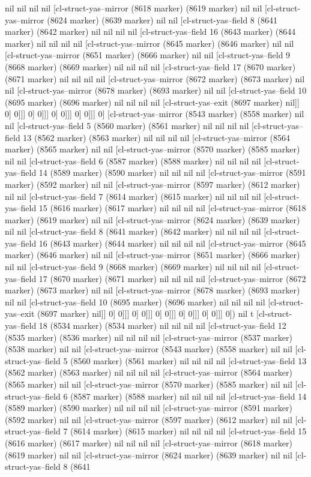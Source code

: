 {{nil nil nil nil [cl-struct-yas--mirror (8618 marker) (8619 marker) nil nil [cl-struct-yas--mirror (8624 marker) (8639 marker) nil nil [cl-struct-yas--field 8 (8641 marker) (8642 marker) nil nil nil nil [cl-struct-yas--field 16 (8643 marker) (8644 marker) nil nil nil nil [cl-struct-yas--mirror (8645 marker) (8646 marker) nil nil [cl-struct-yas--mirror (8651 marker) (8666 marker) nil nil [cl-struct-yas--field 9 (8668 marker) (8669 marker) nil nil nil nil [cl-struct-yas--field 17 (8670 marker) (8671 marker) nil nil nil nil [cl-struct-yas--mirror (8672 marker) (8673 marker) nil nil [cl-struct-yas--mirror (8678 marker) (8693 marker) nil nil [cl-struct-yas--field 10 (8695 marker) (8696 marker) nil nil nil nil [cl-struct-yas--exit (8697 marker) nil]] 0] 0]]] 0] 0]]] 0] 0]]] 0] 0]]] 0] [cl-struct-yas--mirror (8543 marker) (8558 marker) nil nil [cl-struct-yas--field 5 (8560 marker) (8561 marker) nil nil nil nil [cl-struct-yas--field 13 (8562 marker) (8563 marker) nil nil nil nil [cl-struct-yas--mirror (8564 marker) (8565 marker) nil nil [cl-struct-yas--mirror (8570 marker) (8585 marker) nil nil [cl-struct-yas--field 6 (8587 marker) (8588 marker) nil nil nil nil [cl-struct-yas--field 14 (8589 marker) (8590 marker) nil nil nil nil [cl-struct-yas--mirror (8591 marker) (8592 marker) nil nil [cl-struct-yas--mirror (8597 marker) (8612 marker) nil nil [cl-struct-yas--field 7 (8614 marker) (8615 marker) nil nil nil nil [cl-struct-yas--field 15 (8616 marker) (8617 marker) nil nil nil nil [cl-struct-yas--mirror (8618 marker) (8619 marker) nil nil [cl-struct-yas--mirror (8624 marker) (8639 marker) nil nil [cl-struct-yas--field 8 (8641 marker) (8642 marker) nil nil nil nil [cl-struct-yas--field 16 (8643 marker) (8644 marker) nil nil nil nil [cl-struct-yas--mirror (8645 marker) (8646 marker) nil nil [cl-struct-yas--mirror (8651 marker) (8666 marker) nil nil [cl-struct-yas--field 9 (8668 marker) (8669 marker) nil nil nil nil [cl-struct-yas--field 17 (8670 marker) (8671 marker) nil nil nil nil [cl-struct-yas--mirror (8672 marker) (8673 marker) nil nil [cl-struct-yas--mirror (8678 marker) (8693 marker) nil nil [cl-struct-yas--field 10 (8695 marker) (8696 marker) nil nil nil nil [cl-struct-yas--exit (8697 marker) nil]] 0] 0]]] 0] 0]]] 0] 0]]] 0] 0]]] 0] 0]]] 0]) nil t [cl-struct-yas--field 18 (8534 marker) (8534 marker) nil nil nil nil [cl-struct-yas--field 12 (8535 marker) (8536 marker) nil nil nil nil [cl-struct-yas--mirror (8537 marker) (8538 marker) nil nil [cl-struct-yas--mirror (8543 marker) (8558 marker) nil nil [cl-struct-yas--field 5 (8560 marker) (8561 marker) nil nil nil nil [cl-struct-yas--field 13 (8562 marker) (8563 marker) nil nil nil nil [cl-struct-yas--mirror (8564 marker) (8565 marker) nil nil [cl-struct-yas--mirror (8570 marker) (8585 marker) nil nil [cl-struct-yas--field 6 (8587 marker) (8588 marker) nil nil nil nil [cl-struct-yas--field 14 (8589 marker) (8590 marker) nil nil nil nil [cl-struct-yas--mirror (8591 marker) (8592 marker) nil nil [cl-struct-yas--mirror (8597 marker) (8612 marker) nil nil [cl-struct-yas--field 7 (8614 marker) (8615 marker) nil nil nil nil [cl-struct-yas--field 15 (8616 marker) (8617 marker) nil nil nil nil [cl-struct-yas--mirror (8618 marker) (8619 marker) nil nil [cl-struct-yas--mirror (8624 marker) (8639 marker) nil nil [cl-struct-yas--field 8 (8641 }}
